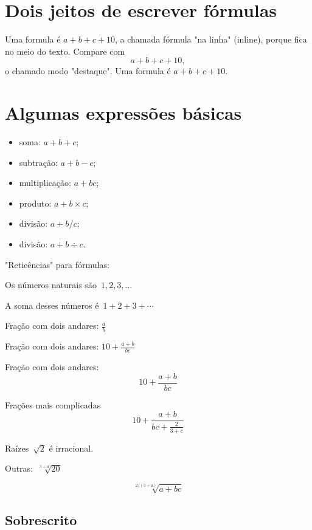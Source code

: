 

\usepackage{amsmath}
\usepackage{amssymb}
\usepackage{amsthm}

\DeclareMathOperator{\sen}{sen}



\chapter{Dois jeitos de escrever fórmulas}

Uma formula é \(a+b+c+10\), a chamada
fórmula "na linha" (inline), porque fica
no meio do texto. Compare com \[a+b+c+10,\]
o chamado modo "destaque".
Uma formula é \(a + b  +  c      +10\).

\chapter{Algumas expressões básicas}

\begin{itemize}
\item soma: \(a + b + c\);
\item subtração: \(a + b - c\);
\item multiplicação: \(a + b c\);
\item produto: \(a + b \times c\);
\item divisão: \(a + b / c\);
\item divisão: \(a + b \div c\).
\end{itemize}

"Reticências" para fórmulas:

Os números naturais são~\(1,2,3,\ldots\)

A soma desses números é~\(1+2+3+\cdots\)

Fração com dois andares: \(\frac{a}{b}\)

Fração com dois andares: \(10 + \frac{a+b}{bc}\)

Fração com dois andares: \[10 + \frac{a+b}{bc}\]

Frações mais complicadas
\[
10 + \frac{a+b}{bc + \frac{2}{3+c}}
\]

Raízes~\(\sqrt{2}\) é irracional.

Outras:~\(\sqrt[3+a]{20}\)

\[
\sqrt[2/(3+a)]{a+bc}
\]

\section{Sobrescrito}

